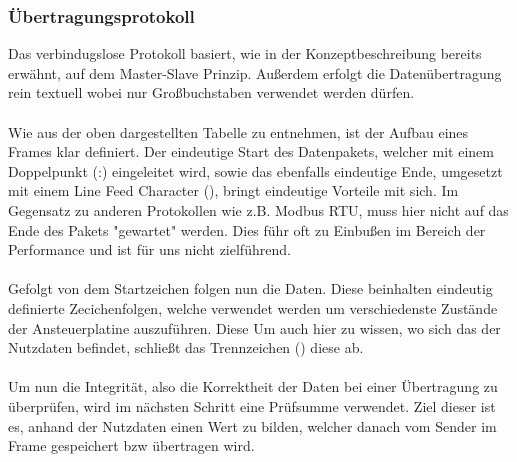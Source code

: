 \subsubsection{Übertragungsprotokoll} \label{sssec:uebertragungsprotokoll}
\begin{table}[H]
    \centering
{}
    \caption{Visualisierung des Datenakets}
\end{table}
Das verbindugslose Protokoll basiert, wie in der Konzeptbeschreibung bereits erwähnt, auf dem Master-Slave Prinzip.
Außerdem erfolgt die Datenübertragung rein textuell wobei nur Großbuchstaben verwendet werden dürfen.\\\\
Wie aus der oben dargestellten Tabelle zu entnehmen, ist der Aufbau eines Frames klar definiert.
Der eindeutige Start des Datenpakets, welcher mit einem Doppelpunkt (:) eingeleitet wird, sowie das ebenfalls eindeutige Ende, umgesetzt mit einem Line Feed Character (), bringt eindeutige Vorteile mit sich.
Im Gegensatz zu anderen Protokollen wie z.B. Modbus RTU, muss hier nicht auf das Ende des Pakets "gewartet" werden.
Dies führ oft zu Einbußen im Bereich der Performance und ist für uns nicht zielführend.\\\\
Gefolgt von dem Startzeichen folgen nun die Daten.
Diese beinhalten eindeutig definierte Zecichenfolgen, welche verwendet werden um verschiedenste Zustände der Ansteuerplatine auszuführen.
Diese Um auch hier zu wissen, wo sich das der Nutzdaten befindet, schließt das Trennzeichen () diese ab.\\\\
Um nun die Integrität, also die Korrektheit der Daten bei einer Übertragung zu überprüfen, wird im nächsten Schritt eine Prüfsumme verwendet.
Ziel dieser ist es, anhand der Nutzdaten einen Wert zu bilden, welcher danach vom Sender im Frame gespeichert bzw übertragen wird.
